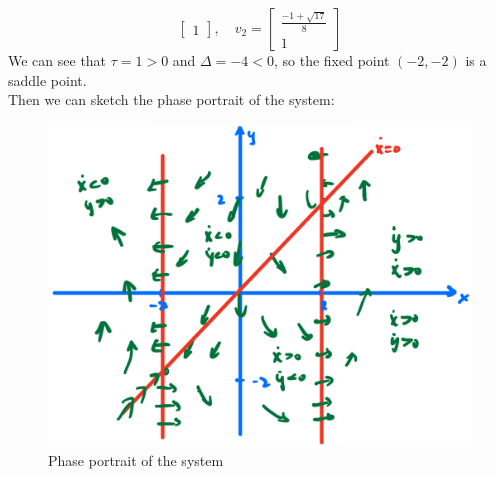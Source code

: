 \documentclass[12pt]{exam}
\begin{document}
\begin{enumerate}[(a)]
\[\begin{bmatrix}
		1
	\end{bmatrix}, \quad v_2 = \begin{bmatrix}
		\frac{-1+\sqrt{17}}{8} \\
		1
	\end{bmatrix} \]
	We can see that $\tau = 1 > 0$ and $\Delta = -4 < 0$, so the fixed point $(-2,-2)$ is a saddle point. \\
	Then we can sketch the phase portrait of the system:	
	\begin{figure}[H]
		\centering
		\includegraphics[width=1\linewidth]{3a.jpeg}
		\caption{Phase portrait of the system}
		\label{fig:3a}
	\end{figure}




\end{enumerate}
\end{document}
